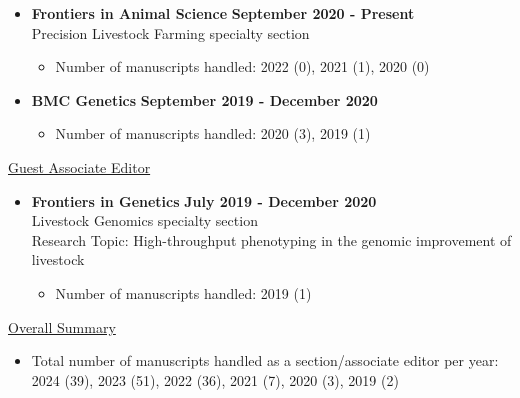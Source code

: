 \documentclass[margin,line,10pt]{res}
\begin{document}
\begin{resume}
\vspace{0.3cm}

\begin{itemize}
\item {\bf Frontiers in Animal Science} \hfill {\bf September 2020 - Present} \\
   Precision Livestock Farming specialty section
  \begin{itemize}
    \item Number of manuscripts handled: 2022 (0), 2021 (1), 2020 (0)
  \end{itemize}
\end{itemize}

\vspace{0.3cm}

\begin{itemize}
\item {\bf BMC Genetics} \hfill {\bf September 2019 - December 2020}
  \begin{itemize}
    \item Number of manuscripts handled: 2020 (3), 2019 (1)
  \end{itemize}
\end{itemize}

\vspace{0.3cm}

\underline{Guest Associate Editor}
\vspace{0.2cm}
\begin{itemize}
\item {\bf Frontiers in Genetics} \hfill  {\bf July 2019 - December 2020} \\
  Livestock Genomics specialty section \\
  Research Topic: High-throughput phenotyping in the genomic improvement of livestock
  \begin{itemize}
    \item Number of manuscripts handled: 2019 (1)
  \end{itemize}
\end{itemize}
\vspace{0.3cm}


\underline{Overall Summary}
 \vspace{.2cm}
\begin{itemize}
\item Total number of manuscripts handled as a section/associate editor per year: 2024 (39), 2023 (51), 2022 (36), 2021 (7), 2020 (3), 2019 (2) 
\end{itemize}


\vspace{0.3cm}



\end{resume}
\end{document}
